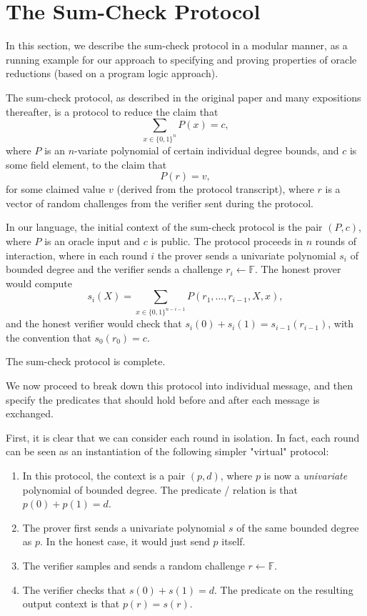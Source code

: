 \section{The Sum-Check Protocol}\label{sec:sumcheck}

In this section, we describe the sum-check protocol in a modular manner, as a running example for our approach to specifying and proving properties of oracle reductions (based on a program logic approach).

The sum-check protocol, as described in the original paper and many expositions thereafter, is a
protocol to reduce the claim that \[ \sum_{x \in \{0, 1\}^n} P(x) = c, \] where $P$ is an
$n$-variate polynomial of certain individual degree bounds, and $c$ is some field element, to the
claim that \[ P(r) = v, \] for some claimed value $v$ (derived from the protocol transcript), where
$r$ is a vector of random challenges from the verifier sent during the protocol.

In our language, the initial context of the sum-check protocol is the pair $(P, c)$, where $P$ is an
oracle input and $c$ is public. The protocol proceeds in $n$ rounds of interaction, where in each
round $i$ the prover sends a univariate polynomial $s_i$ of bounded degree and the verifier sends a
challenge $r_i \gets \mathbb{F}$. The honest prover would compute \[ s_i(X) = \sum_{x \in \{0,
1\}^{n - i - 1}} P(r_1, \ldots, r_{i - 1}, X, x), \] and the honest verifier would check that
$s_i(0) + s_i(1) = s_{i - 1}(r_{i - 1})$, with the convention that $s_0(r_0) = c$.

\begin{theorem}
    The sum-check protocol is complete.
\end{theorem}

We now proceed to break down this protocol into individual message, and then specify the predicates that should hold before and after each message is exchanged.

First, it is clear that we can consider each round in isolation. In fact, each round can be seen as an instantiation of the following simpler "virtual" protocol:
\begin{enumerate}
    \item In this protocol, the context is a pair $(p, d)$, where $p$ is now a \emph{univariate} polynomial of bounded degree. The predicate / relation is that $p(0) + p(1) = d$.
    \item The prover first sends a univariate polynomial $s$ of the same bounded degree as $p$. In
    the honest case, it would just send $p$ itself.
    \item The verifier samples and sends a random challenge $r \gets \mathbb{F}$.
    \item The verifier checks that $s(0) + s(1) = d$. The predicate on the resulting output context
    is that $p(r) = s(r)$.
\end{enumerate}

